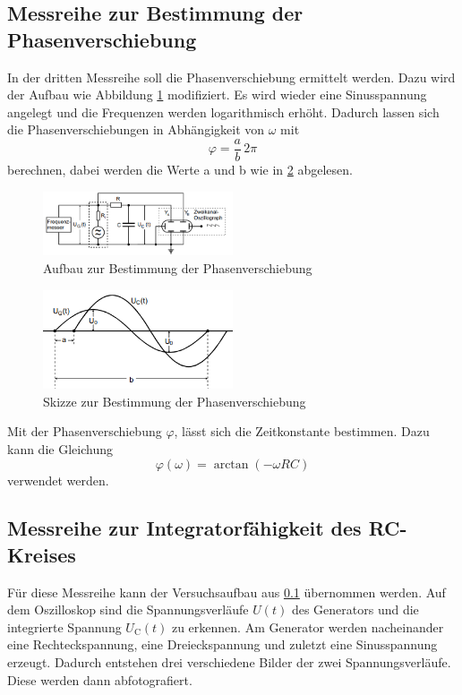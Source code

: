 \subsection{Messreihe zur Bestimmung der Phasenverschiebung}
\label{subsec:Phase}
In der dritten Messreihe soll die Phasenverschiebung ermittelt werden. Dazu wird der Aufbau wie Abbildung \ref{fig:aufbauphi} modifiziert.
Es wird wieder eine Sinusspannung angelegt und die Frequenzen werden logarithmisch erhöht.
Dadurch lassen sich die Phasenverschiebungen in Abhängigkeit von $\omega$ mit
\begin{equation}
    \varphi=\frac{a}{b} \, 2 \pi \label{eqn:phiab}
\end{equation}
berechnen, dabei werden die Werte a und b wie in \ref{fig:wertphi} abgelesen.
\begin{figure}
    \centering
    \caption{Aufbau zur Bestimmung der Phasenverschiebung} 
    \label{fig:aufbauphi}
    \includegraphics[width = 0.5\textwidth]{pics/phasenverschiebung.png}
\end{figure}
\begin{figure}
    \centering
    \caption{Skizze zur Bestimmung der Phasenverschiebung} 
    \label{fig:wertphi}
    \includegraphics[width = 0.5\textwidth]{pics/werteabl.png}
\end{figure}
Mit der Phasenverschiebung $\varphi$, lässt sich die Zeitkonstante bestimmen. Dazu kann die Gleichung
\begin{equation}
    \label{eqn:ficken}
    \varphi (\omega)=\arctan (-\omega RC)
\end{equation}
verwendet werden.
\subsection{Messreihe zur Integratorfähigkeit des RC-Kreises}
Für diese Messreihe kann der Versuchsaufbau aus \ref{subsec:Phase} übernommen werden.
Auf dem Oszilloskop sind die Spannungsverläufe $U(t)$ des Generators und die integrierte Spannung $U_\text{C}(t)$ zu erkennen.
Am Generator werden nacheinander eine Rechteckspannung, eine Dreieckspannung und zuletzt eine Sinusspannung erzeugt.
Dadurch entstehen drei verschiedene Bilder der zwei Spannungsverläufe. Diese werden dann abfotografiert. 